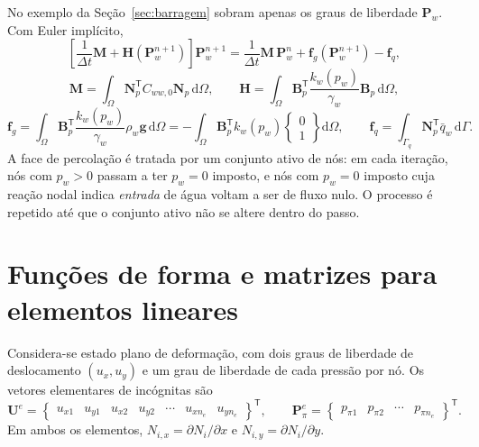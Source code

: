 \documentclass[11pt,a4paper]{article}
\numberwithin{equation}{section}
\newcommand{\dd}{\mathrm{d}}
\begin{document}
No exemplo da Seção~\ref{sec:barragem} sobram apenas os graus de liberdade $\mathbf P_w$.
Com Euler implícito,
\begin{equation}
\boxed{\left[\frac{1}{\Delta t}\mathbf M+\mathbf H(\mathbf P_w^{n+1})\right]\mathbf P_w^{n+1}
=\frac{1}{\Delta t}\mathbf M\,\mathbf P_w^{n}+\mathbf f_g(\mathbf P_w^{n+1})-\mathbf f_q,}
\end{equation}
\begin{equation}
\mathbf M=\int_\Omega\mathbf N_p^{\mathsf T}C_{ww,0}\mathbf N_p\,\dd\Omega,\qquad
\mathbf H=\int_\Omega\mathbf B_p^{\mathsf T}\frac{k_w(p_w)}{\gamma_w}\mathbf B_p\,\dd\Omega,
\end{equation}
\begin{equation}
\mathbf f_g=\int_\Omega\mathbf B_p^{\mathsf T}\frac{k_w(p_w)}{\gamma_w}\rho_w\mathbf g\,\dd\Omega
=-\int_\Omega\mathbf B_p^{\mathsf T}k_w(p_w)\begin{Bmatrix}0\\1\end{Bmatrix}\dd\Omega,
\qquad
\mathbf f_q=\int_{\Gamma_q}\mathbf N_p^{\mathsf T}\bar q_w\,\dd\Gamma .
\end{equation}
A face de percolação é tratada por um conjunto ativo de nós: em cada
iteração, nós com $p_w>0$ passam a ter $p_w=0$ imposto, e nós com
$p_w=0$ imposto cuja reação nodal indica \emph{entrada} de água voltam a
ser de fluxo nulo. O processo é repetido até que o conjunto ativo não se
altere dentro do passo.

\section{Funções de forma e matrizes para elementos lineares}
\label{sec:matrizes}

Considera-se estado plano de deformação, com dois graus de liberdade de
deslocamento $(u_x,u_y)$ e um grau de liberdade de cada pressão por nó.
Os vetores elementares de incógnitas são
\begin{equation}
\mathbf U^e=\begin{Bmatrix}u_{x1}&u_{y1}&u_{x2}&u_{y2}&\cdots&u_{xn_e}&u_{yn_e}\end{Bmatrix}^{\mathsf T},
\qquad
\mathbf P_\pi^e=\begin{Bmatrix}p_{\pi1}&p_{\pi2}&\cdots&p_{\pi n_e}\end{Bmatrix}^{\mathsf T}.
\end{equation}
Em ambos os elementos, $N_{i,x}=\partial N_i/\partial x$ e
$N_{i,y}=\partial N_i/\partial y$.
\end{document}
